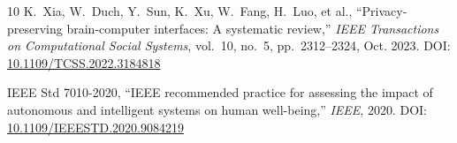 \documentclass{BVP_CINC}
\begin{document}
\begin{thebibliography}{10}
K.~Xia, W.~Duch, Y.~Sun, K.~Xu, W.~Fang, H.~Luo, et al., ``Privacy-preserving brain-computer interfaces: A systematic review,'' \emph{IEEE Transactions on Computational Social Systems}, vol.~10, no.~5, pp.~2312--2324, Oct. 2023. DOI: \href{https://doi.org/10.1109/TCSS.2022.3184818}{10.1109/TCSS.2022.3184818}

IEEE Std 7010-2020, ``IEEE recommended practice for assessing the impact of autonomous and intelligent systems on human well-being,'' \emph{IEEE}, 2020. DOI: \href{https://doi.org/10.1109/IEEESTD.2020.9084219}{10.1109/IEEESTD.2020.9084219}

\end{thebibliography}
\end{document}
